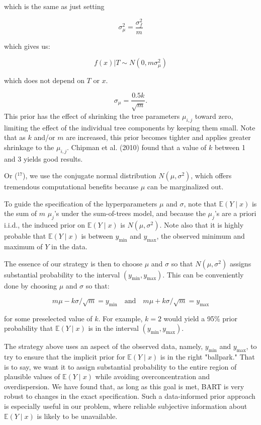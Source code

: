 \documentclass[a4paper,11pt]{article}
\begin{document}
which is the same as just setting

\[
\sigma_\mu^2 = \frac{\sigma_f^2}{m}
\]

which gives us:

\[
f(x) | T \sim N(0, m\sigma_\mu^2)
\]

which does not depend on \( T \) or \( x \).

\[
\sigma_\mu = \frac{0.5 k}{\sqrt{m}}.
\]
This prior has the effect of shrinking the tree parameters \( \mu_{i,j} \) toward zero, limiting the effect of the individual tree components by keeping them small. Note that as \( k \) and/or \( m \) are increased, this prior becomes tighter and applies greater shrinkage to the \( \mu_{i,j} \). Chipman et al. (2010) found that a value of \( k \) between 1 and 3 yields good results.

Or (\(^ {17}\)), we use the conjugate normal distribution \(N(\mu, \sigma^2)\), which offers tremendous computational benefits because \(\mu\) can be marginalized out. 

To guide the specification of the hyperparameters \(\mu\) and \(\sigma\), note that \(\mathbb{E}(Y \mid x)\) is the sum of \(m\) \(\mu_j\)'s under the sum-of-trees model, and because the \(\mu_j\)'s are a priori i.i.d., the induced prior on \(\mathbb{E}(Y \mid x)\) is \(N(\mu, \sigma^2)\). Note also that it is highly probable that \(\mathbb{E}(Y \mid x)\) is between \(y_{\text{min}}\) and \(y_{\text{max}}\), the observed minimum and maximum of \(Y\) in the data.

The essence of our strategy is then to choose \(\mu\) and \(\sigma\) so that \(N(\mu, \sigma^2)\) assigns substantial probability to the interval \((y_{\text{min}}, y_{\text{max}})\). This can be conveniently done by choosing \(\mu\) and \(\sigma\) so that:

\[
m \mu - k \sigma / \sqrt{m} = y_{\text{min}} \quad \text{and} \quad m \mu + k \sigma / \sqrt{m} = y_{\text{max}}
\]

for some preselected value of \(k\). For example, \(k = 2\) would yield a 95\% prior probability that \(\mathbb{E}(Y \mid x)\) is in the interval \((y_{\text{min}}, y_{\text{max}})\).

The strategy above uses an aspect of the observed data, namely, \(y_{\text{min}}\) and \(y_{\text{max}}\), to try to ensure that the implicit prior for \(\mathbb{E}(Y \mid x)\) is in the right "ballpark." That is to say, we want it to assign substantial probability to the entire region of plausible values of \(\mathbb{E}(Y \mid x)\) while avoiding overconcentration and overdispersion. We have found that, as long as this goal is met, BART is very robust to changes in the exact specification. Such a data-informed prior approach is especially useful in our problem, where reliable subjective information about \(\mathbb{E}(Y \mid x)\) is likely to be unavailable.
\end{document}
